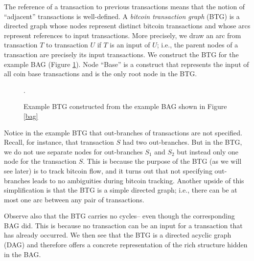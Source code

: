 \documentclass[letterpaper, 10 pt, conference]{ieeeconf}  %
\begin{document}
The reference of a transaction to previous transactions means that the notion of ``adjacent'' transactions is well-defined. A \emph{bitcoin transaction graph} (BTG) is a directed graph whose nodes represent distinct bitcoin transactions and whose arcs represent references to input transactions. More precisely, we draw an arc from transaction $T$ to transaction $U$ if $T$ is an input of $U$; i.e., the parent nodes of a transaction are precisely its input transactions. We construct the BTG for the example BAG (Figure \ref{btg}). Node ``Base'' is a construct that represents the input of all coin base transactions and is the only root node in the BTG. 

\begin{figure}
\centering
{}
\caption{\label{btg} Example BTG constructed from the example BAG shown in Figure \ref{bag}}.
\end{figure}

Notice in the example BTG that out-branches of transactions are not specified. Recall, for instance, that transaction $S$ had two out-branches. But in the BTG, we do not use separate nodes for out-branches $S_1$ and $S_2$ but instead only one node for the transaction $S$. This is because the purpose of the BTG (as we will see later) is to track bitcoin flow, and it turns out that not specifying out-branches leads to no ambiguities during bitcoin tracking. Another upside of this simplification is that the BTG is a simple directed graph; i.e., there can be at most one arc between any pair of transactions.

Observe also that the BTG carries no cycles-- even though the corresponding BAG did. This is because no transaction can be an input for a transaction that has already occurred. We then see that the BTG is a directed acyclic graph (DAG) and therefore offers a concrete representation of the rich structure hidden in the BAG.
\end{document}

